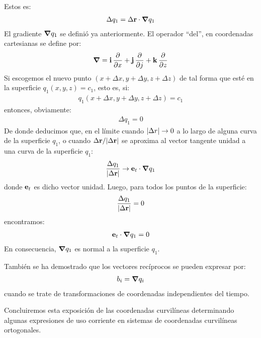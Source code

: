 \documentclass[12pt]{article}
\begin{document}
Estos es:
\begin{align}
    \Delta q_{1} = \Delta \vb{r} \cdot \grad{q_{1}}
    \label{eq:ecuacion_02_88}
\end{align}
El gradiente $\grad{q_{1}}$ se definió ya anteriormente. El operador \enquote{del}, en coordenadas cartesianas se define por:
\begin{align}
    \grad = \vb{i} \, \pdv{x} + \vb{j} \, \pdv{j} + \vb{k} \, \pdv{z}
    \label{ec:ecuacion_02_89}
\end{align}
Si escogemos el nuevo punto $(x + \Delta x, y + \Delta y, z + \Delta z)$ de tal forma que esté en la superficie $q_{1} (x, y, z) = c_{1}$, esto es, si:
\begin{align*}
    q_{1} \left( x + \Delta x, y + \Delta y, z + \Delta z \right) = c_{1}
\end{align*}
entonces, obviamente:
\begin{align*}
    \Delta q_{1} = 0
\end{align*}
De donde deducimos que, en el límite cuando $\abs{\Delta r} \to 0$ a lo largo de alguna curva de la superficie $q_{1}$, o cuando $\Delta \vb{r} / \abs{\Delta \vb{r}}$ se aproxima al vector tangente unidad a una curva de la superficie $q_{1}$: 
\begin{align*}
    \dfrac{\Delta q_{1}}{\abs{\Delta \vb{r}}} \to \vb{e}_{t} \cdot \grad{q_{1}}
\end{align*}
donde $\vb{e}_{t}$ es dicho vector unidad. Luego, para todos los puntos de la superficie:
\begin{align*}
    \dfrac{\Delta q_{1}}{\abs{\Delta \vb{r}}} = 0
\end{align*}
encontramos:
\begin{align*}
    \vb{e}_{t} \cdot \grad{q_{1}} = 0
\end{align*}
En consecuencia, $\grad{q_{1}}$ es normal a la superficie $q_{1}$.
\par
También se ha demostrado que los vectores recíprocos se pueden expresar por:
\begin{align*}
    b_{i} = \grad{q_{i}}
\end{align*}
cuando se trate de transformaciones de coordenadas independientes del tiempo.
\par
Concluiremos esta exposición de las coordenadas curvilíneas determinando algunas expresiones de uso corriente en sistemas de coordenadas curvilíneas ortogonales. 
\end{document}
